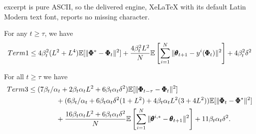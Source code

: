 \documentclass[10pt,a4paper]{amsart}
\begin{document}
excerpt is pure ASCII, so the delivered engine, XeLaTeX with its default Latin Modern text font, reports no missing character.
\begin{lemma}\label{lemma:term1}
For any $t\geq \tau$, we have
    \begin{align}
        \textnormal{Term 1}\leq  4\beta_t^2(L^2+L^4)\mathbb{E}[\|\pmb{\Phi}^*-\pmb{\Phi}_t\|^2]+\frac{4\beta_t^2L^2}{N}\mathbb{E}\left[\sum_{i=1}^N\|\pmb{\theta}_{t+1}-y^i(\pmb{\Phi}_t)\|^2\right]+4\beta_t^2\delta^2
    \end{align}
\end{lemma}

\begin{lemma}\label{lemma:Term3}
For all $t\geq \tau$ we have
\begin{align}\nonumber
    \textnormal{Term 3} &\leq (7\beta_t/\alpha_t+2\beta_t\alpha_t L^2+6\beta_t\alpha_t\delta^2)\mathbb{E}[\|\pmb{\Phi}_{t-\tau}-\pmb{\Phi}_t\|^2]\allowdisplaybreaks\\
    &\qquad\qquad+(6\beta_t/\alpha_t+6\beta_t\alpha_t\delta^2(1+L^2) +4\beta_t\alpha_tL^2(3+4L^2))\mathbb{E}[\|\pmb{\Phi}_t-\pmb{\Phi}^*\|^2]\nonumber\allowdisplaybreaks\\
    &\qquad\qquad+\frac{16\beta_t \alpha_t L^2+6\beta_t\alpha_t\delta^2}{N}\mathbb{E}\left[\sum_{i=1}^N\|\pmb{\theta}^{i,*}-\pmb{\theta}_{t+1}\|^2\right]+11\beta_t\alpha_t\delta^2.
\end{align}

\end{lemma}
\end{document}
